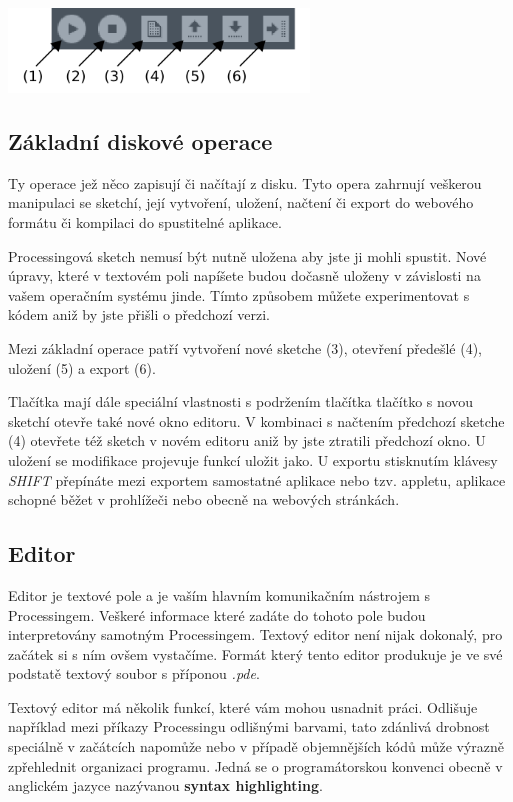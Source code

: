 \documentclass[11pt]{book}
\newcommand{\pododdil}[1]{\subsection{#1}\label{subsec:#1}}
\newcommand{\klavesy}[1]{\textsc{\em #1}}
\newcommand{\slovnik}[1]{\textbf{\gls{#1}}\index{#1}}
\begin{document}
\begin{center}
\includegraphics[width = 0.6\textwidth]{imgs/buttons.png}
\end{center}


\newpage
\pododdil{Základní diskové operace}

Ty operace jež něco zapisují či načítají z disku. Tyto opera zahrnují veškerou manipulaci se sketchí, její vytvoření, uložení, načtení či export do webového formátu či kompilaci do spustitelné aplikace.

Processingová sketch nemusí být nutně uložena aby jste ji mohli spustit. Nové úpravy, které v textovém poli napíšete budou dočasně uloženy v závislosti na vašem operačním systému jinde. Tímto způsobem můžete experimentovat s kódem aniž by jste přišli o předchozí verzi.

Mezi základní operace patří vytvoření nové sketche (3), otevření předešlé (4), uložení (5) a export (6).

Tlačítka mají dále speciální vlastnosti s podržením tlačítka tlačítko s novou sketchí otevře také nové okno editoru. V kombinaci s načtením předchozí sketche (4) otevřete též sketch v novém editoru aniž by jste ztratili předchozí okno. U uložení se modifikace projevuje funkcí uložit jako. U exportu stisknutím klávesy \klavesy{SHIFT} přepínáte mezi exportem samostatné aplikace nebo tzv. appletu, aplikace schopné běžet v prohlížeči nebo obecně na webových stránkách.

\pododdil{Editor}

Editor je textové pole a je vaším hlavním komunikačním nástrojem s Processingem. Veškeré informace které zadáte do tohoto pole budou interpretovány samotným Processingem. Textový editor není nijak dokonalý, pro začátek si s ním ovšem vystačíme. Formát který tento editor produkuje je ve své podstatě textový soubor s příponou {\em *.pde}.




Textový editor má několik funkcí, které vám mohou usnadnit práci. Odlišuje například mezi příkazy Processingu odlišnými barvami, tato zdánlivá drobnost speciálně v začátcích napomůže nebo v případě objemnějších kódů může výrazně zpřehlednit organizaci programu. Jedná se o programátorskou konvenci obecně v anglickém jazyce nazývanou \slovnik{syntax highlighting}.
\end{document}
